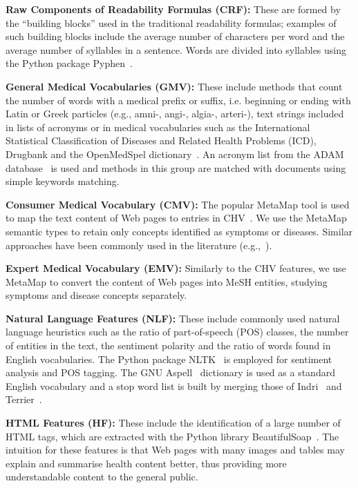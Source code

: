 \textbf{Raw Components of Readability Formulas (CRF):}
These are formed by the ``building blocks'' used in the traditional readability formulas; examples of such building blocks include the average number of characters per word and the average number of syllables in a sentence. Words are divided into syllables using the Python package Pyphen~\cite{pyphen}.

\textbf{General Medical Vocabularies (GMV):}
These include methods that count the number of words with a medical prefix or suffix, i.e. beginning or ending with Latin or Greek particles (e.g., amni-, angi-, algia-, arteri-), text strings included in lists of acronyms or in medical vocabularies such as the International Statistical Classification of Diseases and Related Health Problems (ICD), Drugbank and the OpenMedSpel dictionary~\cite{openmedspel}. An acronym list from the ADAM database~\cite{zhou2006} is used and methods in this group are matched with documents using simple keywords matching.

\textbf{Consumer Medical Vocabulary (CMV):}
The popular MetaMap \cite{aronson10} tool is used to map the text content of Web pages to entries in  CHV~\cite{zeng06}.
We use the MetaMap semantic types to retain only concepts identified as symptoms or diseases. Similar approaches have been commonly used in the literature (e.g.,~\cite{pang16,agrafiotesA16,palotti16,yates13}).

\textbf{Expert Medical Vocabulary (EMV):}
Similarly to the CHV features, we use MetaMap to convert the content of Web pages into MeSH entities, studying symptoms and disease concepts separately. 

\textbf{Natural Language Features (NLF):}
These include commonly used natural language heuristics such as the ratio of part-of-speech (POS) classes, the number of entities in the text, the sentiment polarity and the ratio of words found in English vocabularies. The Python package NLTK~\cite{nltk} is employed for sentiment analysis and POS tagging. The GNU Aspell~\cite{aspell} dictionary is used as a standard English vocabulary and a stop word list is built by merging those of Indri~\cite{indri} and Terrier~\cite{terrier}. 

\textbf{HTML Features (HF):}
These include the identification of a large number of HTML tags, which are extracted with the Python library BeautifulSoap~\cite{bs4}. The intuition for these features is that Web pages with many images and tables may explain and summarise health content better, thus providing more understandable content to the general public. 

